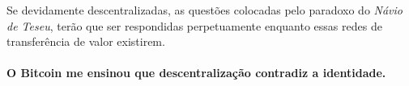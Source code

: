 Se devidamente descentralizadas, as questões colocadas pelo paradoxo do \textit{Návio de Teseu}, terão que ser respondidas perpetuamente enquanto essas redes de transferência de valor existirem.

\paragraph{O Bitcoin me ensinou que descentralização contradiz a identidade.}

%
%
%
%
